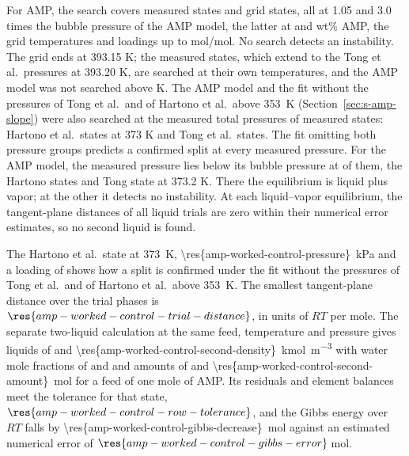 \documentclass[a4paper,11pt]{article}
\begin{document}
For AMP, the search covers  measured states and  grid states, all at 1.05 and 3.0 times the bubble pressure of the AMP model, the latter at  and  wt\% AMP, the  grid temperatures and  loadings up to  mol/mol.
No search detects an instability.
The grid ends at 393.15 K; the measured states, which extend to the Tong et al.\ pressures at 393.20 K, are searched at their own temperatures, and the AMP model was not searched above  K.
The AMP model and the fit without the pressures of Tong et al.\ and of Hartono et al.\ above \SI{353}{\kelvin} (Section~\ref{sec:s-amp-slope}) were also searched at the measured total pressures of  measured states:  Hartono et al.\ states at 373 K and  Tong et al.\ states.
The fit omitting both pressure groups predicts a confirmed split at every measured pressure.
For the AMP model, the measured pressure lies below its bubble pressure at  of them, the  Hartono states and  Tong state at 373.2 K.
There the equilibrium is liquid plus vapor; at the other  it detects no instability.
At each liquid--vapor equilibrium, the tangent-plane distances of all  liquid trials are zero within their numerical error estimates, so no second liquid is found.

The Hartono et al.\ state at \SI{373}{\kelvin}, \SI{\res{amp-worked-control-pressure}}{\kilo\pascal} and a loading of  shows how a split is confirmed under the fit without the pressures of Tong et al.\ and of Hartono et al.\ above \SI{353}{\kelvin}.
The smallest tangent-plane distance over the trial phases is $\res{amp-worked-control-trial-distance}$, in units of $RT$ per mole.
The separate two-liquid calculation at the same feed, temperature and pressure gives liquids of  and \SI{\res{amp-worked-control-second-density}}{\kilo\mole\per\cubic\metre} with water mole fractions of  and  and amounts of  and \SI{\res{amp-worked-control-second-amount}}{\mole} for a feed of one mole of AMP.
Its residuals and element balances meet the tolerance for that state, $\res{amp-worked-control-row-tolerance}$, and the Gibbs energy over $RT$ falls by \SI{\res{amp-worked-control-gibbs-decrease}}{\mole} against an estimated numerical error of $\res{amp-worked-control-gibbs-error}$\,mol.
\end{document}
